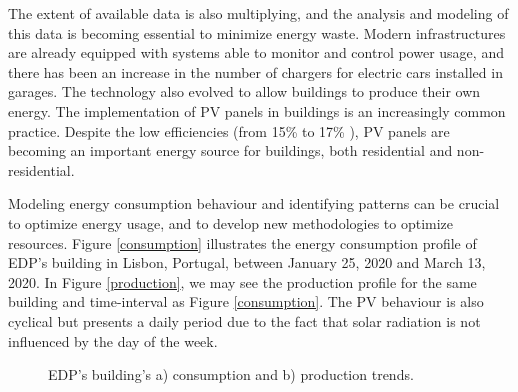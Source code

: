 The extent of available data is also multiplying, and the analysis and modeling of this data is becoming essential to minimize energy waste. Modern infrastructures are already equipped with systems able to monitor and control power usage, and there has been an increase in the number of chargers for electric cars installed in garages. The technology also evolved to allow buildings to produce their own energy. The implementation of \ac{PV} panels in buildings is an increasingly common practice. Despite the low efficiencies (from 15\% to 17\% \cite{pv}), \ac{PV} panels are becoming an important energy source for buildings, both  residential and non-residential. 

Modeling energy consumption behaviour and identifying patterns can be crucial to optimize energy usage, and to develop new methodologies to optimize resources. Figure \ref{consumption} illustrates the energy consumption profile of \ac{EDP}'s building in Lisbon, Portugal, between January 25, 2020 and March 13, 2020. In Figure \ref{production}, we may see the production profile for the same building and time-interval as Figure \ref{consumption}. The \ac{PV} behaviour is also cyclical but presents a daily period due to the fact that solar radiation is not influenced by the day of the week.





\begin{figure}[h!]
\captionsetup[subfigure]{position=b}
\centering
{}
\hspace{0.05\textwidth}
\caption{EDP's building's a) consumption and b) production trends.}
\end{figure}


